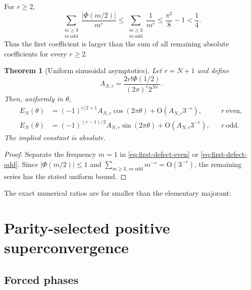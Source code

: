 \documentclass[11pt]{article}
\numberwithin{equation}{section}
\newtheorem{theorem}{Theorem}[section]
\theoremstyle{definition}
\theoremstyle{remark}
\newcommand{\bigO}{\mathrm O}
\newcommand{\abs}[1]{\left|#1\right|}
\begin{document}
For $r\ge2$,
\begin{equation}
 \sum_{\substack{m\ge3\\m\ \mathrm{odd}}}
 \frac{\abs{\Phi(m/2)}}{m^r}
 \le\sum_{\substack{m\ge3\\m\ \mathrm{odd}}}\frac1{m^r}
 \le\frac{\pi^2}{8}-1<\frac14.
 \label{eq:harmonic-tail-bound}
\end{equation}
Thus the first coefficient is larger than the sum of all remaining absolute coefficients for every $r\ge2$.

\begin{theorem}[Uniform sinusoidal asymptotics]
\label{thm:sinusoidal-asymptotics}
Let $r=N+1$ and define
\begin{equation}
 A_{N,r}=\frac{2r!\Phi(1/2)}{(2\pi)^r2^{Nr}}.
 \label{eq:first-harmonic-amplitude}
\end{equation}
Then, uniformly in $\theta$,
\begin{align}
 E_N(\theta)
 &=(-1)^{r/2+1}A_{N,r}\cos(2\pi\theta)
 +\bigO\!\left(A_{N,r}3^{-r}\right),&&r\ \text{even},
 \label{eq:cos-asymptotic}\\
 E_N(\theta)
 &=(-1)^{(r-1)/2}A_{N,r}\sin(2\pi\theta)
 +\bigO\!\left(A_{N,r}3^{-r}\right),&&r\ \text{odd}.
 \label{eq:sin-asymptotic}
\end{align}
The implied constant is absolute.
\end{theorem}

\begin{proof}
Separate the frequency $m=1$ in \eqref{eq:first-defect-even} or \eqref{eq:first-defect-odd}.  Since $\abs{\Phi(m/2)}\le1$ and
$\sum_{m\ge3,\,m\text{ odd}}m^{-r}=\bigO(3^{-r})$, the remaining series has the stated uniform bound.
\end{proof}

The exact numerical ratios are far smaller than the elementary majorant:
\begin{table}[H]
\centering
\caption{Absolute spectral tail divided by the first harmonic.}
\label{tab:harmonic-tail}

\end{table}

\section{Parity-selected positive superconvergence}
\label{sec:superconvergence}

\subsection{Forced phases}
\end{document}
